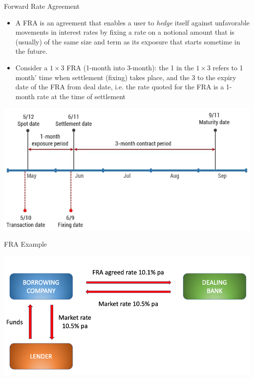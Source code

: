 \documentclass{beamer}
\begin{document}
\begin{frame}{Forward Rate Agreement}
	\begin{itemize}
	\item<1-> A FRA is an agreement that enables a user to \emph{hedge} itself against unfavorable movements in interest rates by fixing a rate on a notional amount that is (usually) of the same size and term as its exposure that starts sometime in the future. 
	\item<2-> Consider a $1\times 3$ FRA (1-month into 3-month): the 1 in the $1\times 3$ refers to 1 month' time when settlement (fixing) takes place, and the 3 to the expiry date of the FRA from deal date, i.e. the rate quoted for the FRA is a 1-month rate at the time of settlement
	\end{itemize}
	\begin{center}
		\includegraphics[width=0.5\linewidth]{fra_timeline}
	\end{center}
\end{frame}

\begin{frame}{FRA Example}
	\begin{center}
		\includegraphics[width=0.9\linewidth]{FRA_diagram}
	\end{center}
\end{frame}
\end{document}
